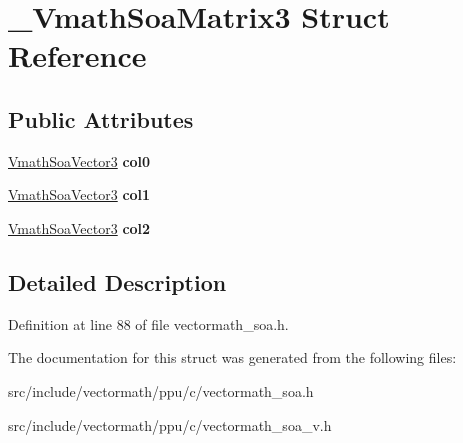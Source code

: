 \hypertarget{struct__VmathSoaMatrix3}{\section{\-\_\-\-Vmath\-Soa\-Matrix3 Struct Reference}
\label{struct__VmathSoaMatrix3}
}
\subsection*{Public Attributes}
\begin{DoxyCompactItemize}
\item 
\hypertarget{struct__VmathSoaMatrix3_a2cbc762d8f354344eb4dcfbeb387418c}{\hyperlink{struct__VmathSoaVector3}{Vmath\-Soa\-Vector3} {\bfseries col0}}\label{struct__VmathSoaMatrix3_a2cbc762d8f354344eb4dcfbeb387418c}

\item 
\hypertarget{struct__VmathSoaMatrix3_abcadb8e2df0b19c7c4f51dae3baaa063}{\hyperlink{struct__VmathSoaVector3}{Vmath\-Soa\-Vector3} {\bfseries col1}}\label{struct__VmathSoaMatrix3_abcadb8e2df0b19c7c4f51dae3baaa063}

\item 
\hypertarget{struct__VmathSoaMatrix3_a7dd4758714cae8483b016e8d233a72a3}{\hyperlink{struct__VmathSoaVector3}{Vmath\-Soa\-Vector3} {\bfseries col2}}\label{struct__VmathSoaMatrix3_a7dd4758714cae8483b016e8d233a72a3}

\end{DoxyCompactItemize}


\subsection{Detailed Description}


Definition at line 88 of file vectormath\-\_\-soa.\-h.



The documentation for this struct was generated from the following files\-:\begin{DoxyCompactItemize}
\item 
src/include/vectormath/ppu/c/vectormath\-\_\-soa.\-h\item 
src/include/vectormath/ppu/c/vectormath\-\_\-soa\-\_\-v.\-h\end{DoxyCompactItemize}
